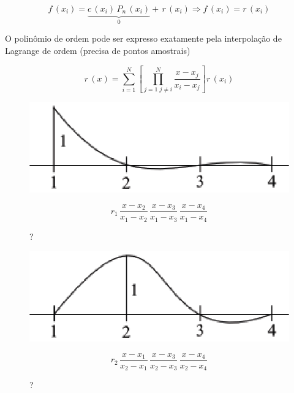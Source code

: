 \begin{enumerate}
\begin{equation}
 \label{cap2:sec6:eq5}
 f\,(x_i) = \underbrace{c\,(x_i) \, P_n\,(x_i)}_{0} + \, r\,(x_i) \Rightarrow f\,(x_i) = r\,(x_i)
\end{equation}

O polinômio  de ordem  pode ser expresso exatamente pela interpolação de Lagrange de ordem  (precisa de  pontos amostrais)

\begin{equation}
 \label{cap2:sec6:eq6}
 r\,(x) =
 \sum_{i=1}^N \left[
  \prod_{
    j=1 \,\, j \neq i
  }^N
  \frac{x-x_j}{x_i-x_j}
 \right]
 r\,(x_i)
\end{equation}

\begin{example}

\begin{figure}[htb]
 \centering
 \begin{minipage}[c]{7cm}
    \includegraphics[scale=0.9]{capitulos/capitulo2/figuras/quadraturas_de_gauss2.eps}
    \caption{?}
    \label{fig:quadraturas_de_gauss2}
 \end{minipage}\hspace*{1cm}
 \begin{minipage}[c]{6cm}
    \[
     r_1 \, \frac{x-x_2}{x_1-x_2} \, \frac{x-x_3}{x_1-x_3} \, \frac{x-x_4}{x_1-x_4}
    \]
 \end{minipage}
\end{figure}

\begin{figure}[htb]
 \centering
 \begin{minipage}[c]{7cm}
    \includegraphics[scale=0.9]{capitulos/capitulo2/figuras/quadraturas_de_gauss3.eps}
    \caption{?}
    \label{fig:quadraturas_de_gauss3}
 \end{minipage}\hspace*{1cm}
 \begin{minipage}[c]{6cm}
    \[
     r_2 \, \frac{x-x_1}{x_2-x_1} \, \frac{x-x_3}{x_2-x_3} \, \frac{x-x_4}{x_2-x_4}
    \]
 \end{minipage}
\end{figure}


\end{example}
\end{enumerate}
